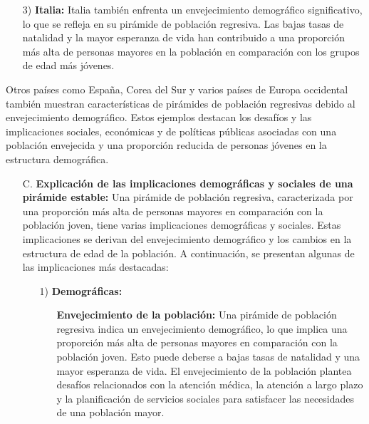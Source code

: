 \documentclass[8pt,a4paper]{beamer}
\begin{document}
{\begin{frame}{}
\begin{block}{}
\begin{enumerate}
\begin{enumerate}
\item[3)] \textbf{Italia:} Italia también enfrenta un envejecimiento demográfico significativo, lo que se refleja en su pirámide de población regresiva. Las bajas tasas de natalidad y la mayor esperanza de vida han contribuido a una proporción más alta de personas mayores en la población en comparación con los grupos de edad más jóvenes.
\end{enumerate}
Otros países como España, Corea del Sur y varios países de Europa occidental también muestran características de pirámides de población regresivas debido al envejecimiento demográfico. Estos ejemplos destacan los desafíos y las implicaciones sociales, económicas y de políticas públicas asociadas con una población envejecida y una proporción reducida de personas jóvenes en la estructura demográfica.
\end{enumerate}
\end{block}
\end{frame}

\begin{frame}{}
\begin{block}{}
\justifying
\begin{enumerate}
\justifying
\item[C.] \textbf{Explicación de las implicaciones demográficas y sociales de una pirámide estable:} Una pirámide de población regresiva, caracterizada por una proporción más alta de personas mayores en comparación con la población joven, tiene varias implicaciones demográficas y sociales. Estas implicaciones se derivan del envejecimiento demográfico y los cambios en la estructura de edad de la población. A continuación, se presentan algunas de las implicaciones más destacadas:
\begin{enumerate}
\justifying
\item[1)] \textbf{Demográficas:} 
\begin{itemize}
\justifying
\item[\ding{65}] \textbf{Envejecimiento de la población:} Una pirámide de población regresiva indica un envejecimiento demográfico, lo que implica una proporción más alta de personas mayores en comparación con la población joven. Esto puede deberse a bajas tasas de natalidad y una mayor esperanza de vida. El envejecimiento de la población plantea desafíos relacionados con la atención médica, la atención a largo plazo y la planificación de servicios sociales para satisfacer las necesidades de una población mayor.


\end{itemize}
\end{enumerate}
\end{enumerate}
\end{block}
\end{frame}}
\end{document}
